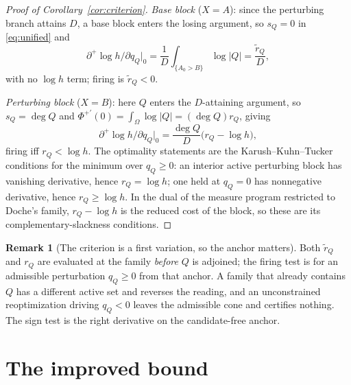 \documentclass[11pt,reqno]{amsart}
\theoremstyle{plain}
\theoremstyle{definition}
\newtheorem{remark}[theorem]{Remark}
\newcommand{\rQ}{r_Q}
\newcommand{\dplus}{\partial^{+}}
\begin{document}
\begin{proof}[Proof of Corollary~\ref{cor:criterion}]
\emph{Base block} ($X=A$): since the perturbing branch attains $D$, a base block
enters the losing argument, so $s_Q=0$ in \eqref{eq:unified} and
\begin{equation}\label{eq:base-marg}
  \dplus\!\log h/\partial q_Q\big|_0=\frac1D\int_{\{A_0>B\}}\log|Q|
  =\frac{\widetilde r_Q}{D},
\end{equation}
with no $\log h$ term; firing is $\widetilde r_Q<0$.

\emph{Perturbing block} ($X=B$): here $Q$ enters the $D$-attaining argument, so
$s_Q=\deg Q$ and $\Phi^{+\prime}(0)=\int_\Omega\log|Q|=(\deg Q)\rQ$, giving
\begin{equation}\label{eq:marginal}
  \dplus\!\log h/\partial q_Q\big|_0=\frac{\deg Q}{D}\bigl(\rQ-\log h\bigr),
\end{equation}
firing iff $\rQ<\log h$. The optimality statements are the Karush--Kuhn--Tucker
conditions for the minimum over $q_Q\ge0$: an interior active perturbing block has
vanishing derivative, hence $\rQ=\log h$; one held at $q_Q=0$ has nonnegative
derivative, hence $\rQ\ge\log h$. In the dual of the \citet[\S6]{BMQS} measure program
restricted to Doche's family, $\rQ-\log h$ is the reduced cost of the block, so these
are its complementary-slackness conditions.
\end{proof}

\begin{remark}[The criterion is a first variation, so the anchor matters]\label{rem:anchor}
Both $\widetilde r_Q$ and $\rQ$ are evaluated at the family \emph{before} $Q$ is
adjoined; the firing test is for an admissible perturbation $q_Q\ge0$ from that anchor.
A family that already contains $Q$ has a different active set and reverses the reading,
and an unconstrained reoptimization driving $q_Q<0$ leaves the admissible cone and
certifies nothing. The sign test is the right derivative on the candidate-free anchor.
\end{remark}

\section{The improved bound}\label{sec:bound}
\end{document}
